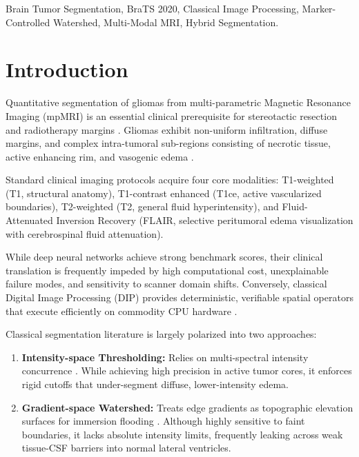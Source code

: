 \documentclass[10pt,conference]{IEEEtran}
\begin{document}
\begin{IEEEkeywords}
Brain Tumor Segmentation, BraTS 2020, Classical Image Processing, Marker-Controlled Watershed, Multi-Modal MRI, Hybrid Segmentation.
\end{IEEEkeywords}

\section{Introduction}
Quantitative segmentation of gliomas from multi-parametric Magnetic Resonance Imaging (mpMRI) is an essential clinical prerequisite for stereotactic resection and radiotherapy margins \cite{menze2015brats}. Gliomas exhibit non-uniform infiltration, diffuse margins, and complex intra-tumoral sub-regions consisting of necrotic tissue, active enhancing rim, and vasogenic edema \cite{bakas2017advancing}. 

Standard clinical imaging protocols acquire four core modalities: T1-weighted (T1, structural anatomy), T1-contrast enhanced (T1ce, active vascularized boundaries), T2-weighted (T2, general fluid hyperintensity), and Fluid-Attenuated Inversion Recovery (FLAIR, selective peritumoral edema visualization with cerebrospinal fluid attenuation).

While deep neural networks achieve strong benchmark scores, their clinical translation is frequently impeded by high computational cost, unexplainable failure modes, and sensitivity to scanner domain shifts. Conversely, classical Digital Image Processing (DIP) provides deterministic, verifiable spatial operators that execute efficiently on commodity CPU hardware \cite{gonzalez2018dip}.

Classical segmentation literature is largely polarized into two approaches:
\begin{enumerate}
    \item \textbf{Intensity-space Thresholding:} Relies on multi-spectral intensity concurrence \cite{otsu1979threshold}. While achieving high precision in active tumor cores, it enforces rigid cutoffs that under-segment diffuse, lower-intensity edema.
    \item \textbf{Gradient-space Watershed:} Treats edge gradients as topographic elevation surfaces for immersion flooding \cite{vincent1991watersheds}. Although highly sensitive to faint boundaries, it lacks absolute intensity limits, frequently leaking across weak tissue-CSF barriers into normal lateral ventricles.
\end{enumerate}
\end{document}
